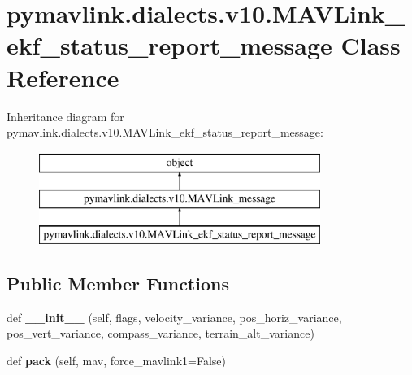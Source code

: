 \hypertarget{classpymavlink_1_1dialects_1_1v10_1_1MAVLink__ekf__status__report__message}{}\section{pymavlink.\+dialects.\+v10.\+M\+A\+V\+Link\+\_\+ekf\+\_\+status\+\_\+report\+\_\+message Class Reference}
\label{classpymavlink_1_1dialects_1_1v10_1_1MAVLink__ekf__status__report__message}
Inheritance diagram for pymavlink.\+dialects.\+v10.\+M\+A\+V\+Link\+\_\+ekf\+\_\+status\+\_\+report\+\_\+message\+:\begin{figure}[H]
\begin{center}
\leavevmode
\includegraphics[height=3.000000cm]{classpymavlink_1_1dialects_1_1v10_1_1MAVLink__ekf__status__report__message}
\end{center}
\end{figure}
\subsection*{Public Member Functions}
\begin{DoxyCompactItemize}
\item 
\mbox{\label{classpymavlink_1_1dialects_1_1v10_1_1MAVLink__ekf__status__report__message_ac3d591b4adfcd3d019f43d532dec881c}} 
def {\bfseries \+\_\+\+\_\+init\+\_\+\+\_\+} (self, flags, velocity\+\_\+variance, pos\+\_\+horiz\+\_\+variance, pos\+\_\+vert\+\_\+variance, compass\+\_\+variance, terrain\+\_\+alt\+\_\+variance)
\item 
\mbox{\label{classpymavlink_1_1dialects_1_1v10_1_1MAVLink__ekf__status__report__message_a5ef6fa32302ffa76c2f3e1b5df824007}} 
def {\bfseries pack} (self, mav, force\+\_\+mavlink1=False)
\end{DoxyCompactItemize}
